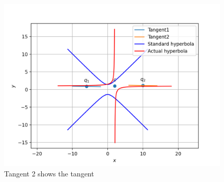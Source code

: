   \begin{figure}[h!]
	\centering
	\includegraphics[width=\columnwidth]{./solutions/conics/1/12/Assignment_7.png}
	\caption{Tangent 2 shows the tangent}
	\label{eq:solutions/12/myfig}
\end{figure}

